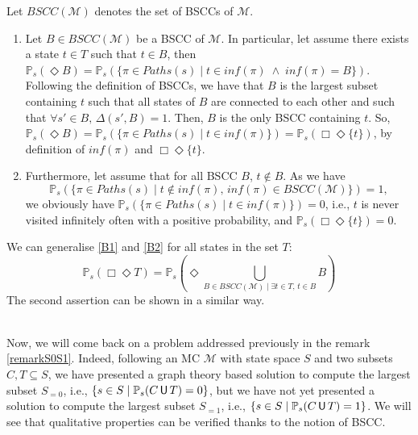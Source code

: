 \begin{proof2}
Let $BSCC(\mathcal{M})$ denotes the set of BSCCs of $\mathcal{M}$.
\begin{enumerate}
\item
Let $B \in BSCC(\mathcal{M})$ be a BSCC of $\mathcal{M}$.
In particular, let assume there exists a state $t \in T$ such that $t \in B$, then $\mathbb{P}_s(\Diamond B) = \mathbb{P}_s(\{ \pi \in Paths(s) \; | \; t \in inf(\pi) \; \wedge \; inf(\pi) = B \})$. Following the definition of BSCCs, we have that $B$ is the largest subset containing $t$ such that all states of $B$ are connected to each other and such that $\forall s' \in B, \, \Delta(s', B)=1$. Then, $B$ is the only BSCC containing $t$. So,
$\mathbb{P}_s(\Diamond B) = \mathbb{P}_s(\{ \pi \in Paths(s) \; | \; t \in inf(\pi)\}) = \mathbb{P}_s(\Box \Diamond \{t\})$,
by definition of $inf(\pi)$ and $\Box\Diamond \{t\}$.
\label{B1}
\item
Furthermore, let assume that for all BSCC $B$, $t \notin B$. As we have \[\mathbb{P}_s(\{\pi \in Paths(s)\; | \; t \notin inf(\pi), \, inf(\pi) \in BSCC(\mathcal{M})\}) = 1,\]
we obviously have $\mathbb{P}_s(\{\pi \in Paths(s)\; | \; t \in inf(\pi)\}) = 0$, i.e., $t$ is never visited infinitely often with a positive probability, and $\mathbb{P}_s(\Box\Diamond \{t\}) = 0$.
\label{B2}
\end{enumerate}
We can generalise \ref{B1} and \ref{B2} for all states in the set $T$:
\[\mathbb{P}_s(\Box \Diamond T) = \mathbb{P}_s(\Diamond \bigcup_{B \in BSCC(\mathcal{M}) \; | \; \exists t \in T, \, t \in B } B)\]
The second assertion can be shown in a similar way.
\end{proof2}\\

Now, we will come back on a problem addressed previously in the remark \ref{remarkS0S1}. Indeed, following an MC $\mathcal{M}$ with state space $S$ and two subsets $C, T \subseteq S$, we have presented a graph theory based solution to compute the largest subset $S_{=0}$, i.e., $\{s \in S \; | \; \mathbb{P}_s(C \,\text{\sffamily U}\, T) = 0\}$, but we have not yet presented a solution to compute the largest subset $S_{=1}$, i.e., $\{s \in S \; | \; \mathbb{P}_s(C \,\text{\sffamily U}\, T) = 1\}$.
We will see that qualitative properties can be verified thanks to the notion of BSCC.

